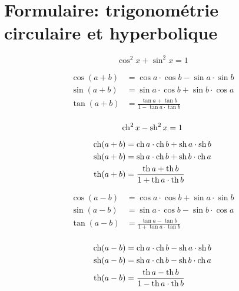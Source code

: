\documentclass[10pt,class=article,crop=false]{standalone}
\begin{document}
\section{Formulaire: trigonométrie circulaire et hyperbolique}


\begin{multicols}{2}
	
	$$\cos^2 x + \sin^2 x = 1$$
	
	\begin{align*}
		\cos(a+b)&=\cos a\cdot\cos b - \sin a\cdot\sin b\\
		\sin(a+b)&=\sin a\cdot\cos b  +  \sin b\cdot\cos a \\
		\tan (a+b)&=\frac{\tan a + \tan b}{1-\tan a\cdot\tan b} \\
	\end{align*}
	
	
	$$\operatorname{ch}^2 x - \operatorname{sh}^2 x = 1$$
	
	\begin{align*}
		\operatorname{ch}(a+b)&=\operatorname{ch} a\cdot\operatorname{ch} b + \operatorname{sh} a\cdot\operatorname{sh} b\\
		\operatorname{sh}(a+b)&=\operatorname{sh} a\cdot\operatorname{ch} b  +  \operatorname{sh} b\cdot\operatorname{ch} a\\
		\operatorname{th} (a+b)&=\frac{\operatorname{th} a + \operatorname{th} b}{1+\operatorname{th} a\cdot\operatorname{th} b}\\
	\end{align*}
\end{multicols}



\begin{multicols}{2}
	\begin{align*}
		\cos(a-b)&=\cos a\cdot\cos b + \sin a\cdot\sin b\\
		\sin(a-b)&=\sin a\cdot\cos b  - \sin b\cdot\cos a \\
		\tan (a-b)&=\frac{\tan a - \tan b}{1+\tan a\cdot\tan b} \\
	\end{align*}
	
	\begin{align*}
		\operatorname{ch}(a-b)&=\operatorname{ch} a\cdot\operatorname{ch} b - \operatorname{sh} a\cdot\operatorname{sh} b\\
		\operatorname{sh}(a-b)&=\operatorname{sh} a\cdot\operatorname{ch} b  - \operatorname{sh} b\cdot\operatorname{ch} a\\
		\operatorname{th} (a-b)&=\frac{\operatorname{th} a - \operatorname{th} b}{1-\operatorname{th} a\cdot\operatorname{th} b}\\
	\end{align*}
	
\end{multicols}
\end{document}
